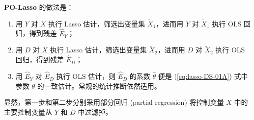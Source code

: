 \vspace{5pt}
\textbf{PO-Lasso} 的做法是：\label{page:lasso-polasso}

\begin{enumerate}
\item 用 $Y$ 对 $X$ 执行 Lasso 估计，筛选出变量集 $\widetilde{X}_1$，进而用 $Y$ 对 $\widetilde{X}_1$ 执行 OLS 回归，得到残差 $\widehat{E}_Y$；
\item 用 $D$ 对 $X$ 执行 Lasso 估计，筛选出变量集 $\widetilde{X}_2$，进而用 $D$ 对 $\widetilde{X}_2$ 执行 OLS 回归，得到残差 $\widehat{E}_D$；
\item 用 $\widehat{E}_Y$ 对 $\widehat{E}_D$ 执行 OLS 估计，则 $\widehat{E}_D$ 的系数 $\widehat{\theta}$ 便是 (\ref{eq:lasso-DS-01A}) 式中参数 $\theta$ 的一致估计。常规的统计推断依然适用。
\end{enumerate}

显然，第一步和第二步分别采用部分回归 (partial regression) 将控制变量 $X$ 中的主要控制变量从 $Y$ 和 $D$ 中过滤掉。
 


